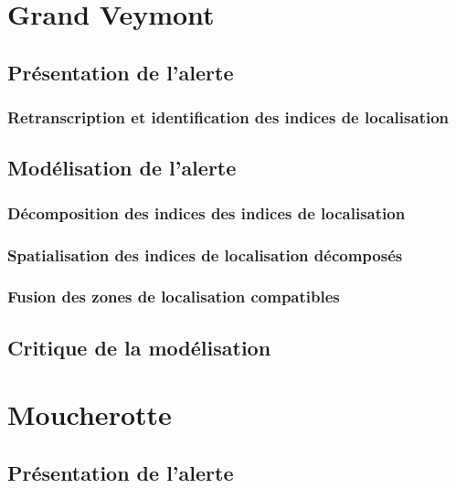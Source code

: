 
\chaptertoc{}

\section{Grand Veymont}
\label{sec:9-1}

\subsection{Présentation de l'alerte}
\label{subsec:9-1-1}

\subsubsection{Retranscription et identification des indices de localisation}
\label{subsec:9-1-1-1}

\subsection{Modélisation de l'alerte}
\label{subsec:9-1-2}


\subsubsection{Décomposition des indices des indices de localisation}
\label{subsec:9-1-2-2}

\subsubsection{Spatialisation des indices de localisation décomposés}
\label{subsec:9-1-2-3}

\subsubsection{Fusion des zones de localisation compatibles}
\label{subsec:9-1-2-4}

\subsection{Critique de la modélisation}
\label{subsec:9-1-3}



\section{Moucherotte}
\label{sec:9-2}

\subsection{Présentation de l'alerte}
\label{subsec:9-2-1}

